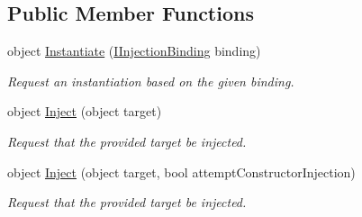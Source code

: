 \subsection*{Public Member Functions}
\begin{DoxyCompactItemize}
\item 
object \hyperlink{interfacestrange_1_1extensions_1_1injector_1_1api_1_1_i_injector_ab6c185a183b27708e38c4954195fe591}{Instantiate} (\hyperlink{interfacestrange_1_1extensions_1_1injector_1_1api_1_1_i_injection_binding}{I\-Injection\-Binding} binding)
\begin{DoxyCompactList}\small\item\em Request an instantiation based on the given binding. \end{DoxyCompactList}\item 
\hypertarget{interfacestrange_1_1extensions_1_1injector_1_1api_1_1_i_injector_a3c4b0fc21caebeafe42ad797001181e8}{object \hyperlink{interfacestrange_1_1extensions_1_1injector_1_1api_1_1_i_injector_a3c4b0fc21caebeafe42ad797001181e8}{Inject} (object target)}\label{interfacestrange_1_1extensions_1_1injector_1_1api_1_1_i_injector_a3c4b0fc21caebeafe42ad797001181e8}

\begin{DoxyCompactList}\small\item\em Request that the provided target be injected. \end{DoxyCompactList}\item 
\hypertarget{interfacestrange_1_1extensions_1_1injector_1_1api_1_1_i_injector_a82ddabe54623ed3caed1ad607b679ad1}{object \hyperlink{interfacestrange_1_1extensions_1_1injector_1_1api_1_1_i_injector_a82ddabe54623ed3caed1ad607b679ad1}{Inject} (object target, bool attempt\-Constructor\-Injection)}\label{interfacestrange_1_1extensions_1_1injector_1_1api_1_1_i_injector_a82ddabe54623ed3caed1ad607b679ad1}

\begin{DoxyCompactList}\small\item\em Request that the provided target be injected. \end{DoxyCompactList}\end{DoxyCompactItemize}
